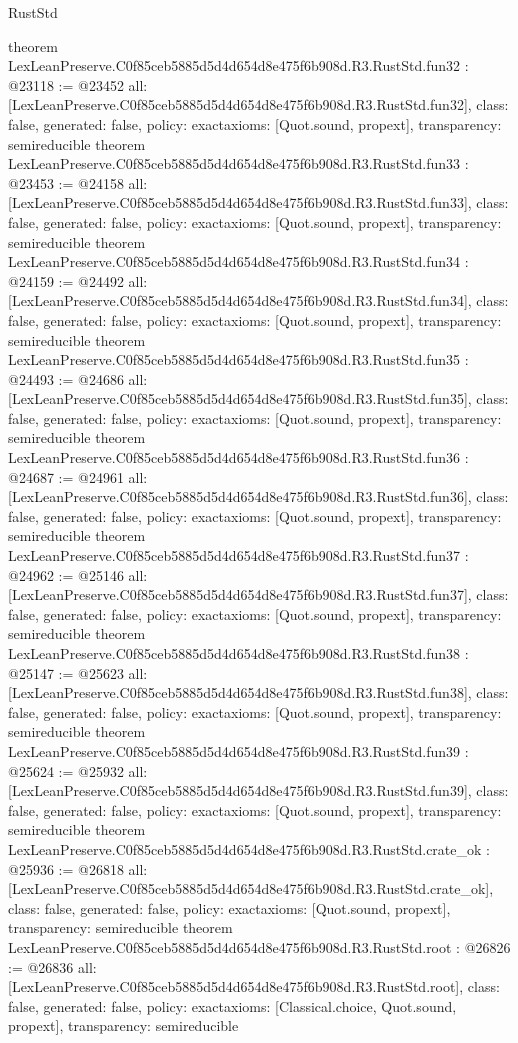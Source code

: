 \begin{lexlean}{RustStd}
\begin{coremodule}
{}
theorem LexLeanPreserve.C0f85ceb5885d5d4d654d8e475f6b908d.R3.RustStd.fun32 : @23118 := @23452 {
  all: [LexLeanPreserve.C0f85ceb5885d5d4d654d8e475f6b908d.R3.RustStd.fun32],
  class: false,
  generated: false,
  policy: exact{axioms: [Quot.sound, propext]},
  transparency: semireducible
}
theorem LexLeanPreserve.C0f85ceb5885d5d4d654d8e475f6b908d.R3.RustStd.fun33 : @23453 := @24158 {
  all: [LexLeanPreserve.C0f85ceb5885d5d4d654d8e475f6b908d.R3.RustStd.fun33],
  class: false,
  generated: false,
  policy: exact{axioms: [Quot.sound, propext]},
  transparency: semireducible
}
theorem LexLeanPreserve.C0f85ceb5885d5d4d654d8e475f6b908d.R3.RustStd.fun34 : @24159 := @24492 {
  all: [LexLeanPreserve.C0f85ceb5885d5d4d654d8e475f6b908d.R3.RustStd.fun34],
  class: false,
  generated: false,
  policy: exact{axioms: [Quot.sound, propext]},
  transparency: semireducible
}
theorem LexLeanPreserve.C0f85ceb5885d5d4d654d8e475f6b908d.R3.RustStd.fun35 : @24493 := @24686 {
  all: [LexLeanPreserve.C0f85ceb5885d5d4d654d8e475f6b908d.R3.RustStd.fun35],
  class: false,
  generated: false,
  policy: exact{axioms: [Quot.sound, propext]},
  transparency: semireducible
}
theorem LexLeanPreserve.C0f85ceb5885d5d4d654d8e475f6b908d.R3.RustStd.fun36 : @24687 := @24961 {
  all: [LexLeanPreserve.C0f85ceb5885d5d4d654d8e475f6b908d.R3.RustStd.fun36],
  class: false,
  generated: false,
  policy: exact{axioms: [Quot.sound, propext]},
  transparency: semireducible
}
theorem LexLeanPreserve.C0f85ceb5885d5d4d654d8e475f6b908d.R3.RustStd.fun37 : @24962 := @25146 {
  all: [LexLeanPreserve.C0f85ceb5885d5d4d654d8e475f6b908d.R3.RustStd.fun37],
  class: false,
  generated: false,
  policy: exact{axioms: [Quot.sound, propext]},
  transparency: semireducible
}
theorem LexLeanPreserve.C0f85ceb5885d5d4d654d8e475f6b908d.R3.RustStd.fun38 : @25147 := @25623 {
  all: [LexLeanPreserve.C0f85ceb5885d5d4d654d8e475f6b908d.R3.RustStd.fun38],
  class: false,
  generated: false,
  policy: exact{axioms: [Quot.sound, propext]},
  transparency: semireducible
}
theorem LexLeanPreserve.C0f85ceb5885d5d4d654d8e475f6b908d.R3.RustStd.fun39 : @25624 := @25932 {
  all: [LexLeanPreserve.C0f85ceb5885d5d4d654d8e475f6b908d.R3.RustStd.fun39],
  class: false,
  generated: false,
  policy: exact{axioms: [Quot.sound, propext]},
  transparency: semireducible
}
theorem LexLeanPreserve.C0f85ceb5885d5d4d654d8e475f6b908d.R3.RustStd.crate_ok : @25936 := @26818 {
  all: [LexLeanPreserve.C0f85ceb5885d5d4d654d8e475f6b908d.R3.RustStd.crate_ok],
  class: false,
  generated: false,
  policy: exact{axioms: [Quot.sound, propext]},
  transparency: semireducible
}
theorem LexLeanPreserve.C0f85ceb5885d5d4d654d8e475f6b908d.R3.RustStd.root : @26826 := @26836 {
  all: [LexLeanPreserve.C0f85ceb5885d5d4d654d8e475f6b908d.R3.RustStd.root],
  class: false,
  generated: false,
  policy: exact{axioms: [Classical.choice, Quot.sound, propext]},
  transparency: semireducible
}


\end{coremodule}
\end{lexlean}
